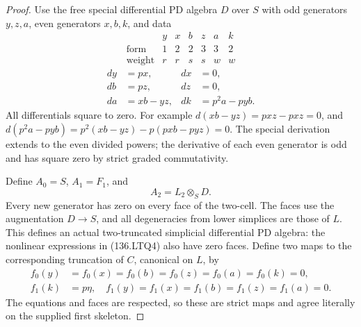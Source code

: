 \begin{proof}
Use the free special differential PD algebra \(D\) over
\(S\) with odd generators \(y,z,a\), even generators
\(x,b,k\), and data
\[
 \begin{array}{c|rrrrrr}
        &y&x&b&z&a&k\\ \hline
 \text{form}&1&2&2&3&3&2\\
 \text{weight}&r&r&s&s&w&w
 \end{array}
\]
\[
 \begin{aligned}
 dy&=p x,& dx&=0,\\
 db&=p z,& dz&=0,\\
 da&=x b-y z,& dk&=p^2a-p yb.
 \end{aligned}
                                                        \tag{136.LTQ4}
\]
All differentials square to zero.  For example
\(d(xb-yz)=p xz-p xz=0\), and
\(d(p^2a-pyb)=p^2(xb-yz)-p(px b-pyz)=0\).
The special derivation extends to the even divided powers;
the derivative of each even generator is odd and has square
zero by strict graded commutativity.

Define \(A_0=S\), \(A_1=F_1\), and
\[
                         A_2=L_2\otimes_S D.
                                                        \tag{136.LTQ5}
\]
Every new generator has zero on every face of the two-cell.
The faces use the augmentation \(D\to S\), and all
degeneracies from lower simplices are those of \(L\).
This defines an actual two-truncated simplicial differential
PD algebra: the nonlinear expressions in (136.LTQ4) also
have zero faces.  Define two maps to the corresponding
truncation of \(C\), canonical on \(L\), by
\[
 \begin{aligned}
 f_0(y)&=f_0(x)=f_0(b)=f_0(z)=f_0(a)=f_0(k)=0,\\
 f_1(k)&=p\eta,\quad
 f_1(y)=f_1(x)=f_1(b)=f_1(z)=f_1(a)=0.
 \end{aligned}
                                                        \tag{136.LTQ6}
\]
The equations and faces are respected, so these are strict
maps and agree literally on the supplied first skeleton.


\end{proof}
